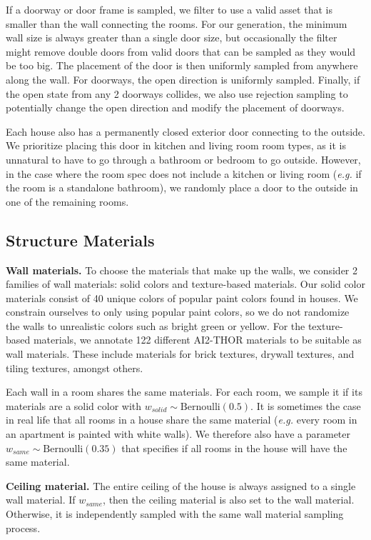 If a doorway or door frame is sampled, we filter to use a valid asset that is smaller than the wall connecting the rooms. For our generation, the minimum wall size is always greater than a single door size, but occasionally the filter might remove double doors from valid doors that can be sampled as they would be too big. The placement of the door is then uniformly sampled from anywhere along the wall. For doorways, the open direction is uniformly sampled. Finally, if the open state from any 2 doorways collides, we also use rejection sampling to potentially change the open direction and modify the placement of doorways.

Each house also has a permanently closed exterior door connecting to the outside. We prioritize placing this door in kitchen and living room room types, as it is unnatural to have to go through a bathroom or bedroom to go outside. However, in the case where the room spec does not include a kitchen or living room (\textit{e.g.} if the room is a standalone bathroom), we randomly place a door to the outside in one of the remaining rooms.

\subsection{Structure Materials}

\textbf{Wall materials.} To choose the materials that make up the walls, we consider 2 families of wall materials: solid colors and texture-based materials. Our solid color materials consist of 40 unique colors of popular paint colors found in houses. We constrain ourselves to only using popular paint colors, so we do not randomize the walls to unrealistic colors such as bright green or yellow. For the texture-based materials, we annotate 122 different AI2-THOR materials to be suitable as wall materials. These include materials for brick textures, drywall textures, and tiling textures, amongst others.

Each wall in a room shares the same materials. For each room, we sample it if its materials are a solid color with $w_{\textit{solid}} \sim \text{Bernoulli}(0.5)$. It is sometimes the case in real life that all rooms in a house share the same material (\textit{e.g.} every room in an apartment is painted with white walls). We therefore also have a parameter $w_{\textit{same}} \sim \text{Bernoulli}(0.35)$ that specifies if all rooms in the house will have the same material.

\textbf{Ceiling material.} The entire ceiling of the house is always assigned to a single wall material. If $w_{\textit{same}}$, then the ceiling material is also set to the wall material. Otherwise, it is independently sampled with the same wall material sampling process.

